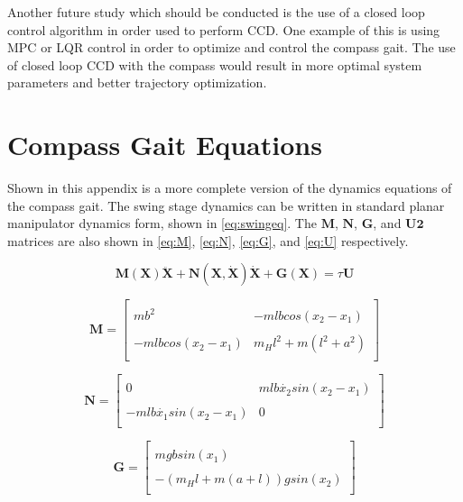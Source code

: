 \documentclass{./springer/svjour3}
\newcommand{\mb}[1]{\mathbf{#1}}
\begin{document}
Another future study which should be conducted is the use of a closed loop control algorithm in order used to perform CCD. One example of this is using 
MPC or LQR control in order to optimize and control the compass gait. The use of closed loop CCD with the compass would result in more optimal system parameters 
and better trajectory optimization. 

\clearpage
\appendix

\section{Compass Gait Equations}

Shown in this appendix is a more complete version of the dynamics equations of the compass gait. The swing stage dynamics can be written in standard planar manipulator 
dynamics form, shown in \ref{eq:swingeq}. The $\mb{M}$, $\mb{N}$, $\mb{G}$, and $\mb{U2}$ matrices are also shown in \ref{eq:M}, \ref{eq:N}, \ref{eq:G}, and \ref{eq:U} respectively.

\begin{equation}
\label{eq:swingeq}
\mb{M(X)}\mb{\ddot{X}} + \mb{N(X, \dot{X})}\mb{\dot{X}} + \mb{G(X)} = \tau\mb{U}
\end{equation}

\begin{equation}
\mb{M} = 
\label{eq:M}
\begin{bmatrix}
\\mb^2 &  -mlbcos(x_2 - x_1)\\
\\-mlbcos(x_2 - x_1) &  m_{H}l^2 + m(l^2 + a^2)\\
\end{bmatrix}
\end{equation}

\begin{equation}
\mb{N} = 
\label{eq:N}
\begin{bmatrix}
\\0 &  mlb\dot{x_2}sin(x_2 - x_1)\\
\\-mlb\dot{x_1}sin(x_2 - x_1) &  0\\
\end{bmatrix}
\end{equation}

\begin{equation}
\mb{G} = 
\label{eq:G}
\begin{bmatrix}
\\mgbsin(x_1)\\
\\-(m_{H}l + m(a+l))gsin(x_2)\\
\end{bmatrix}
\end{equation}
\end{document}
